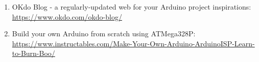 \documentclass{article}
\begin{document}
\begin{appendices}
\begin{enumerate}
    \item OKdo Blog - a regularly-updated web for your Arduino project inspirations: \href{https://www.okdo.com/okdo-blog/}{https://www.okdo.com/okdo-blog/}
    
    \item Build your own Arduino from scratch using ATMega328P: \\ \href{https://www.instructables.com/Make-Your-Own-Arduino-ArduinoISP-Learn-to-Burn-Boo/}{https://www.instructables.com/Make-Your-Own-Arduino-ArduinoISP-Learn-to-Burn-Boo/}

\end{enumerate}

\end{appendices}
\end{document}
